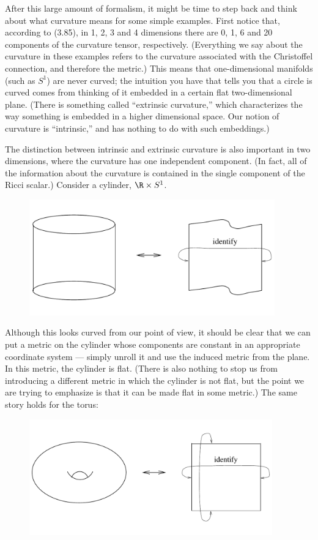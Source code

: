 \documentclass[12pt]{article}
\begin{document}
After this large amount of formalism, it might be time to step back
and think about what curvature means for some simple examples.
First notice that, according to (3.85), in 1, 2, 3 and 4 dimensions
there are 0, 1, 6 and 20 components of the curvature tensor,
respectively.  (Everything we say about the curvature in these
examples refers to the curvature associated with the Christoffel
connection, and therefore the metric.)
This means that one-dimensional manifolds (such as $S^1$) are never
curved; the intuition you have that tells you that a circle is
curved comes from thinking of it embedded in a certain flat
two-dimensional plane.  (There is something called ``extrinsic
curvature,'' which characterizes the way something is embedded
in a higher dimensional space.  Our notion of curvature is ``intrinsic,''
and has nothing to do with such embeddings.)

The distinction between intrinsic and extrinsic curvature is also
important in two dimensions, where the curvature has one independent
component.  (In fact, all of the information about the curvature is 
contained in the single component of the Ricci scalar.)  Consider
a cylinder, $\R\times S^1$.
\begin{figure}
  \centerline{
  \includegraphics[height=5cm]{pdf/three9}}
\end{figure}
Although this looks curved from our point of view, it
should be clear that we can put a metric on the cylinder whose
components are constant in an appropriate coordinate system ---
simply unroll it and use the induced metric from the plane.  In this
metric, the cylinder is flat.  (There is also nothing to stop us from
introducing a different metric in which the cylinder is not flat, but
the point we are trying to emphasize is that it can be made flat in
some metric.)  The same story holds for the torus:

\begin{figure}[h]
  \centerline{
  \includegraphics[height=5cm]{pdf/three10}}
\end{figure}
\end{document}
